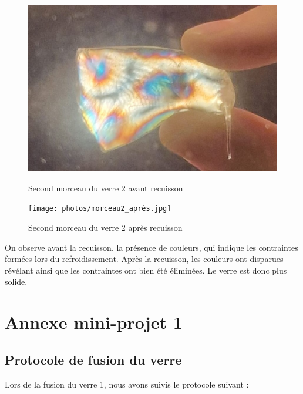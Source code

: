\documentclass{article}
\begin{document}
\begin{figure}[h]
    \centering
    \begin{minipage}{0.3\textwidth}
        \centering
        \includegraphics[width=\textwidth]{photos/morceau2_avant.jpg}
        \caption{Second morceau du verre 2 avant recuisson}
    \end{minipage}
    \hspace{0.5cm}
    \begin{minipage}{0.25\textwidth}
        \centering
        \texttt{[image: photos/morceau2\_après.jpg]}
        \caption{Second morceau du verre 2 après recuisson}
    \end{minipage}
\end{figure}

On observe avant la recuisson, la présence de couleurs, qui indique les contraintes formées lors du refroidissement. Après la recuisson, les couleurs ont disparues révélant ainsi que les contraintes ont bien été éliminées. Le verre est donc plus solide.

\section{Annexe mini-projet 1}
\subsection{Protocole de fusion du verre}

Lors de la fusion du verre 1, nous avons suivis le protocole suivant :
\end{document}
